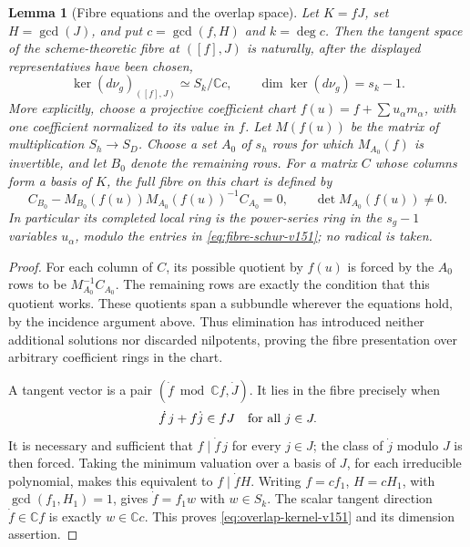 \documentclass[11pt,reqno]{amsart}
\numberwithin{equation}{section}
\newtheorem{lemma}[theorem]{Lemma}
\theoremstyle{definition}\newtheorem{definition}[theorem]{Definition}
\theoremstyle{remark}\newtheorem{remark}[theorem]{Remark}
\newcommand{\C}{\mathbb C}\newcommand{\Q}{\mathbb Q}
\begin{document}
\begin{lemma}[Fibre equations and the overlap space]
\label{lem:fibre-equations-v151}
Let \(K=fJ\), set \(H=\gcd(J)\), and put \(c=\gcd(f,H)\) and
\(k=\deg c\).  Then the tangent space of the scheme-theoretic fibre
at \(([f],J)\) is naturally, after the displayed representatives have
been chosen,
\begin{equation}\label{eq:overlap-kernel-v151}
 \ker(d\nu_g)_{([f],J)}\simeq S_k/\C c,
                     \qquad \dim\ker(d\nu_g)=s_k-1.
\end{equation}
More explicitly, choose a projective coefficient chart
\(f(u)=f+\sum u_\alpha m_\alpha\), with one coefficient normalized
to its value in \(f\).  Let \(M(f(u))\) be the matrix of
multiplication \(S_h\to S_D\).  Choose a set \(A_0\) of \(s_h\)
rows for which \(M_{A_0}(f)\) is invertible, and let \(B_0\) denote
the remaining rows.  For a matrix \(C\) whose columns form a basis
of \(K\), the full fibre on this chart is defined by
\begin{equation}\label{eq:fibre-schur-v151}
 C_{B_0}-M_{B_0}(f(u))M_{A_0}(f(u))^{-1}C_{A_0}=0,
             \qquad \det M_{A_0}(f(u))\ne0.
\end{equation}
In particular its completed local ring is the power-series ring in
the \(s_g-1\) variables \(u_\alpha\), modulo the entries in
\eqref{eq:fibre-schur-v151}; no radical is taken.
\end{lemma}
\begin{proof}
For each column of \(C\), its possible quotient by \(f(u)\) is forced
by the \(A_0\) rows to be \(M_{A_0}^{-1}C_{A_0}\).  The remaining
rows are exactly the condition that this quotient works.  These
quotients span a subbundle wherever the equations hold, by the
incidence argument above.  Thus elimination has introduced neither
additional solutions nor discarded nilpotents, proving the fibre
presentation over arbitrary coefficient rings in the chart.

A tangent vector is a pair \((\dot f\bmod\C f,\dot J)\).  It lies
in the fibre precisely when
\[
              \dot f\,j+f\dot j\in fJ\quad\hbox{for all }j\in J.
\]
It is necessary and sufficient that \(f\mid\dot f\,j\) for every
\(j\in J\); the class of \(\dot j\) modulo \(J\) is then forced.
Taking the minimum valuation over a basis of \(J\), for each
irreducible polynomial, makes this equivalent to \(f\mid\dot f H\).
Writing \(f=cf_1\), \(H=cH_1\), with \(\gcd(f_1,H_1)=1\), gives
\(\dot f=f_1w\) with \(w\in S_k\).  The scalar tangent direction
\(\dot f\in\C f\) is exactly \(w\in\C c\).  This proves
\eqref{eq:overlap-kernel-v151} and its dimension assertion.
\end{proof}
\end{document}
